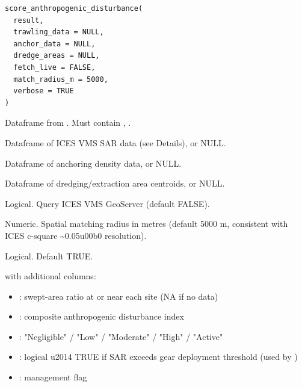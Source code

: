 \documentclass[a4paper]{book}
\begin{document}
%
\begin{Usage}
\begin{verbatim}
score_anthropogenic_disturbance(
  result,
  trawling_data = NULL,
  anchor_data = NULL,
  dredge_areas = NULL,
  fetch_live = FALSE,
  match_radius_m = 5000,
  verbose = TRUE
)
\end{verbatim}
\end{Usage}
%
\begin{Arguments}
\begin{ldescription}
\item[\code{result}] Dataframe from . Must contain , .

\item[\code{trawling\_data}] Dataframe of ICES VMS SAR data (see Details), or NULL.

\item[\code{anchor\_data}] Dataframe of anchoring density data, or NULL.

\item[\code{dredge\_areas}] Dataframe of dredging/extraction area centroids, or NULL.

\item[\code{fetch\_live}] Logical. Query ICES VMS GeoServer (default FALSE).

\item[\code{match\_radius\_m}] Numeric. Spatial matching radius in metres (default
5000 m, consistent with ICES c-square \textasciitilde{}0.05\bsl{}u00b0 resolution).

\item[\code{verbose}] Logical. Default TRUE.
\end{ldescription}
\end{Arguments}
%
\begin{Value}
 with additional columns:
\begin{itemize}

\item{} : swept-area ratio at or near each site (NA if no data)
\item{}  : composite anthropogenic disturbance index
\item{} : "Negligible" / "Low" / "Moderate" / "High" / "Active"
\item{} : logical \bsl{}u2014 TRUE if SAR exceeds gear deployment
threshold (used by )
\item{} : management flag

\end{itemize}

\end{Value}
\end{document}
